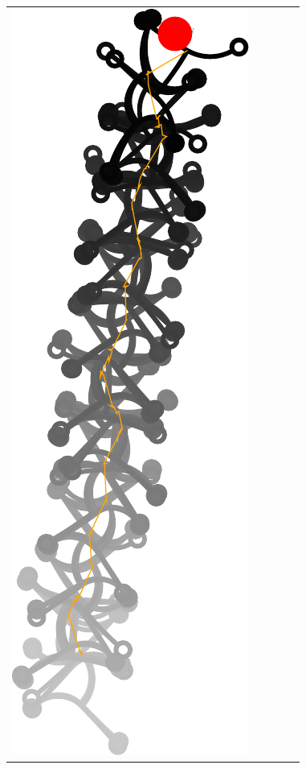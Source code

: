 \documentclass[10pt,a4paper]{article}
\begin{document}
\begin{tabular}{ccccc}
\includegraphics[scale=.5]{pics/pathplanner_with_noise/example_straight_03/gait.pdf}
&

\end{tabular}
\end{document}
